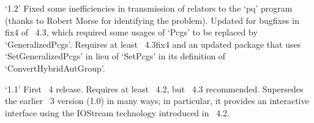 \item{`1.2'}
Fixed some inefficiencies in transmission of relators to the `pq' program
(thanks to  Robert  Morse  for  identifying  the  problem).  Updated  for
bugfixes in fix4 of {\GAP}~4.3, which required some usages of  `Pcgs'  to
be replaced by `GeneralizedPcgs'. Requires at least {\GAP}~4.3fix4 and an
updated {\AutPGrp} package that  uses  `SetGeneralizedPcgs'  in  lieu  of
`SetPcgs' in its definition of `ConvertHybridAutGroup'.

\item{`1.1'}
First {\GAP}~4 release. Requires  at  least  {\GAP}~4.2,  but  {\GAP}~4.3
recommended. Supersedes the earlier {\GAP}~3 version (1.0) in many  ways;
in particular, it provides an interactive interface  using  the  IOStream
technology introduced in {\GAP}~4.2.

\endlist

